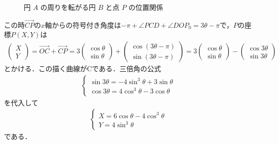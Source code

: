 \documentclass[../../main.tex]{subfiles}
\begin{document}
\begin{figure}[htb]
\begin{center}
  \end{center}
  \caption{円 $A$ の周りを転がる円 $B$ と点 $P$ の位置関係}
\end{figure}

この時$\overrightarrow{CP}$の$x$軸からの符号付き角度は$-\pi+\angle PCD+\angle DOP_0 = 3\theta-\pi$で，$P$の座標$P(X,Y)$は
\begin{align}
  \begin{pmatrix}X\\Y
  \end{pmatrix}=\overrightarrow{OC}+\overrightarrow{CP}=3
  \begin{pmatrix}\cos\theta\\\sin\theta
  \end{pmatrix}+
  \begin{pmatrix}\cos(3\theta-\pi)\\\sin(3\theta-\pi)
  \end{pmatrix}=3
  \begin{pmatrix}\cos\theta\\\sin\theta
  \end{pmatrix}-
  \begin{pmatrix}\cos3\theta\\\sin3\theta
  \end{pmatrix} \label{eq:1}
\end{align}
とかける．この描く曲線がCである．三倍角の公式
\begin{align}
  \begin{cases}
    \sin 3\theta = -4\sin^3\theta + 3\sin \theta \\
    \cos 3\theta =  4\cos^3\theta - 3\cos \theta
  \end{cases}
\end{align}
を代入して
\begin{align}
  \begin{cases}
    X = 6\cos\theta - 4\cos^3\theta \\
    Y = 4\sin^3\theta
  \end{cases} \label{eq:2}
\end{align}
である．
\end{document}
